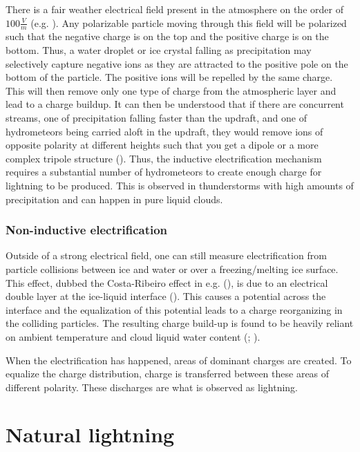 There is a fair weather electrical field present in the atmosphere on the order of $100 \frac{V}{m}$ (e.g. \cite{harrison2012}). Any polarizable particle moving through this field will be polarized such that the negative charge is on the top and the positive charge is on the bottom. Thus, a water droplet or ice crystal falling as precipitation may selectively capture negative ions as they are attracted to the positive pole on the bottom of the particle. The positive ions will be repelled by the same charge. This will then remove only one type of charge from the atmospheric layer and lead to a charge buildup. It can then be understood that if there are concurrent streams, one of precipitation falling faster than the updraft, and one of hydrometeors being carried aloft in the updraft, they would remove ions of opposite polarity at different heights such that you get a dipole or a more complex tripole structure (\cite{stolzenburg1998c}). Thus, the inductive electrification mechanism requires a substantial number of hydrometeors to create enough charge for lightning to be produced. This is observed in thunderstorms with high amounts of precipitation and can happen in pure liquid clouds.

\subsubsection{Non-inductive electrification}
Outside of a strong electrical field, one can still measure electrification from particle collisions between ice and water or over a freezing/melting ice surface. This effect, dubbed the Costa-Ribeiro effect in e.g. (\cite{pinatti1966}), is due to an electrical double layer at the ice-liquid interface (\cite{kallay2015}). This causes a potential across the interface and the equalization of this potential leads to a charge reorganizing in the colliding particles. The resulting charge build-up is found to be heavily reliant on ambient temperature and cloud liquid water content (\cite{saunders2005}; \cite{takahashi1999}). 

When the electrification has happened, areas of dominant charges are created. To equalize the charge distribution, charge is transferred between these areas of different polarity. These discharges are what is observed as lightning. 

\section{Natural lightning}


